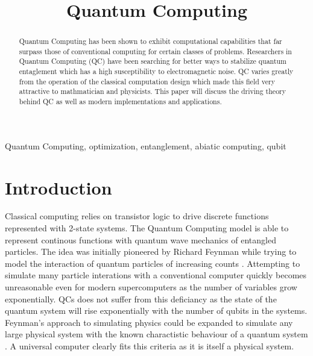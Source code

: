 \documentclass[conference]{IEEEtran}
\begin{document}
\title{Quantum Computing}

\author{
\and
{}
}

\maketitle

\begin{abstract}
Quantum Computing has been shown to exhibit computational capabilities that far surpass those of conventional computing for certain classes of problems. Researchers in Quantum Computing (QC) have been searching for better ways to stabilize quantum entaglement which has a high susceptibility to electromagnetic noise. QC varies greatly from the operation of the classical computation design which made this field very attractive to mathmatician and physicists. This paper will discuss the driving theory behind QC as well as modern implementations and applications.
\end{abstract}

\begin{IEEEkeywords}
Quantum Computing, optimization, entanglement, abiatic computing, qubit
\end{IEEEkeywords}

\section{Introduction}

Classical computing relies on transistor logic to drive discrete functions represented with 2-state systems. The Quantum Computing model is able to represent continous functions with quantum wave mechanics of entangled particles. The idea was initially pioneered by Richard Feynman while trying to model the interaction of quantum particles of increasing counts \cite{b1}. Attempting to simulate many particle interations with a conventional computer quickly becomes unreasonable even for modern supercomputers as the number of variables grow exponentially. QCs does not suffer from this deficiancy as the state of the quantum system will rise exponentially with the number of qubits in the systems. Feynman's approach to simulating physics could be expanded to simulate any large physical system with the known charactistic behaviour of a quantum system \cite{b2}. A universal computer clearly fits this criteria as it is itself a physical system.\\
\end{document}
